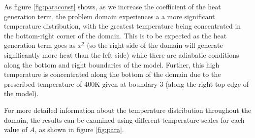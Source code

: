\documentclass[letterpaper,10pt]{article}
\begin{document}
As figure \ref{fig:paraconst} shows, as we increase the coefficient of the heat generation term, the problem domain experiences a a more significant temperature distribution, with the greatest temperature being concentrated in the bottom-right corner of the domain. This is to be expected as the heat generation term goes as $x^2$ (so the right side of the domain will generate significantly more heat than the left side) while there are adiabatic conditions along the bottom and right boundaries of the model. Further, this high temperature is concentrated along the bottom of the domain due to the prescribed temperature of \unit{400}{K} given at boundary 3 (along the right-top edge of the model).

For more detailed information about the temperature distribution throughout the domain, the results can be examined using different temperature scales for each value of $A$, as shown in figure \ref{fig:para}.
\end{document}
